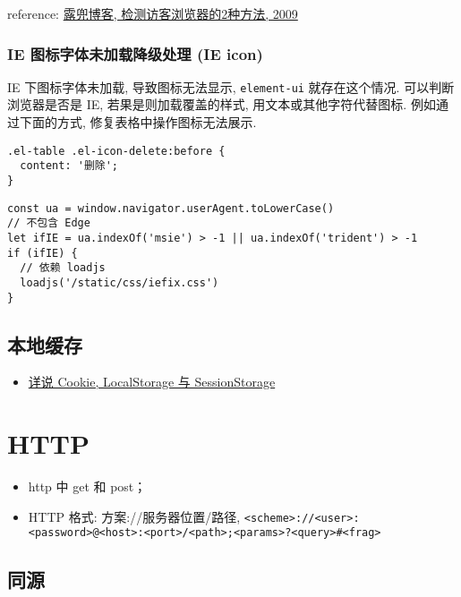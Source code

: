 reference:
\href{http://www.ludou.org/2-way-to-detect-browser.html}{露兜博客,
检测访客浏览器的2种方法, 2009}

\subsubsection{IE 图标字体未加载降级处理 (IE
icon)}\label{ie-ux56feux6807ux5b57ux4f53ux672aux52a0ux8f7dux964dux7ea7ux5904ux7406-ie-icon}

IE 下图标字体未加载, 导致图标无法显示, \lstinline!element-ui!
就存在这个情况. 可以判断浏览器是否是 IE, 若果是则加载覆盖的样式,
用文本或其他字符代替图标. 例如通过下面的方式,
修复表格中操作图标无法展示.

\begin{lstlisting}
.el-table .el-icon-delete:before {
  content: '删除';
}
\end{lstlisting}

\begin{lstlisting}
const ua = window.navigator.userAgent.toLowerCase()
// 不包含 Edge
let ifIE = ua.indexOf('msie') > -1 || ua.indexOf('trident') > -1
if (ifIE) {
  // 依赖 loadjs
  loadjs('/static/css/iefix.css')
}
\end{lstlisting}

\subsection{本地缓存}\label{ux672cux5730ux7f13ux5b58}

\begin{itemize}
\tightlist
\item
  \href{http://jerryzou.com/posts/cookie-and-web-storage/}{详说 Cookie,
  LocalStorage 与 SessionStorage}
\end{itemize}

\section{HTTP}\label{http}

\begin{itemize}
\tightlist
\item
  http 中 get 和 post；
\item
  HTTP 格式: 方案://服务器位置/路径,
  \lstinline!<scheme>://<user>:<password>@<host>:<port>/<path>;<params>?<query>#<frag>!
\end{itemize}

\subsection{同源}\label{ux540cux6e90}

